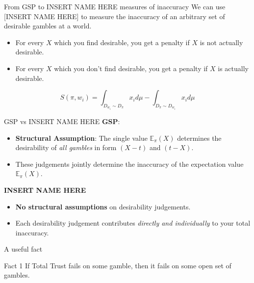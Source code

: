 \documentclass[aspectratio=169, dvipsnames]{beamer}
\newcommand{\E}{\mathbb{E}}
\begin{document}
\begin{frame}{From GSP to INSERT NAME HERE measures of inaccuracy}
  We can use [INSERT NAME HERE] to measure the inaccuracy of an arbitrary set of desirable gambles at a
  world.
  \begin{itemize}
  \item For every $X$ which you find desirable, you get a penalty if $X$ is not actually desirable.
  \item For every $X$ which you don't find desirable, you get a penalty if $X$ is actually desirable.
  \end{itemize}
  \begin{equation}
      \label{KonekScoreDefAppendix}
      S(\pi, w_i) = \int_{D_{w_i} \sim D_{\pi}} x_i d\mu - \int_{D_{\pi} \sim D_{w_i}} x_i d\mu 
    \end{equation}
\end{frame}

\begin{frame}{GSP vs INSERT NAME HERE}
  \textbf{GSP}:
  \begin{itemize}
  \item \alert{\textbf{Structural Assumption}}: The single value $\E_{\pi}(X)$ determines the desirability of
    \textit{all gambles} in form $(X - t)$ and $(t-X)$.
  \item These judgements jointly determine the inaccuracy of the expectation value $\E_{\pi}(X)$.
  \end{itemize}
  \textbf{INSERT NAME HERE}
  \begin{itemize}
  \item \alert{\textbf{No structural assumptions}} on desirability judgements.
  \item Each desirability judgement contributes \textit{directly and individually} to your total inaccuracy.
  \end{itemize}
\end{frame}


\begin{frame}{A useful fact}
  \begin{block}{Fact 1}
    If Total Trust fails on some gamble, then it fails on some open set of gambles.
  \end{block}
\end{frame}
\end{document}
